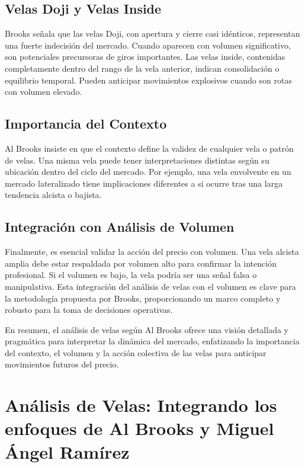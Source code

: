\subsection{Velas Doji y Velas Inside}

Brooks se\~nala que las velas Doji, con apertura y cierre casi id\'enticos, representan una fuerte indecisi\'on del mercado. Cuando aparecen con volumen significativo, son potenciales precursoras de giros importantes. Las velas inside, contenidas completamente dentro del rango de la vela anterior, indican consolidaci\'on o equilibrio temporal. Pueden anticipar movimientos explosivos cuando son rotas con volumen elevado.

\subsection{Importancia del Contexto}

Al Brooks insiste en que el contexto define la validez de cualquier vela o patr\'on de velas. Una misma vela puede tener interpretaciones distintas seg\'un su ubicaci\'on dentro del ciclo del mercado. Por ejemplo, una vela envolvente en un mercado lateralizado tiene implicaciones diferentes a si ocurre tras una larga tendencia alcista o bajista.

\subsection{Integraci\'on con An\'alisis de Volumen}

Finalmente, es esencial validar la acci\'on del precio con volumen. Una vela alcista amplia debe estar respaldada por volumen alto para confirmar la intenci\'on profesional. Si el volumen es bajo, la vela podr\'ia ser una se\~nal falsa o manipulativa. Esta integraci\'on del an\'alisis de velas con el volumen es clave para la metodolog\'ia propuesta por Brooks, proporcionando un marco completo y robusto para la toma de decisiones operativas.

En resumen, el an\'alisis de velas seg\'un Al Brooks ofrece una visi\'on detallada y pragm\'atica para interpretar la din\'amica del mercado, enfatizando la importancia del contexto, el volumen y la acci\'on colectiva de las velas para anticipar movimientos futuros del precio.

\section{An\'alisis de Velas: Integrando los enfoques de Al Brooks y Miguel \'Angel Ram\'irez}

